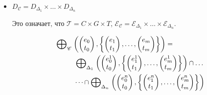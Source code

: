 \begin{itemize}

\item  $D_{\mathscr{C}} = D_{\Delta_1} \times \dots \times D_{\Delta_n}$

Это означает, что $\mathcal{T} = C \times G \times T$, $\mathcal{E}_{\mathscr{C}} = \mathcal{E}_{\Delta_1} \times \dots \times \mathcal{E}_{\Delta_n}$.

\begin{equation}
\label{composite_epp_def}
\begin{aligned}
& \mathrel{\bigoplus}_{\mathscr{C}}
\left(
\begin{pmatrix}
e_0 \\
t_0 
\end{pmatrix},
\left\{
\begin{pmatrix}
e_1 \\
t_1 
\end{pmatrix},
\dots ,
\begin{pmatrix}
e_m \\
t_m 
\end{pmatrix}
\right\}
\right) = \\
& \hspace{1cm} \mathrel{\bigoplus}_{\Delta_1}
\left(
\begin{pmatrix}
e^1_0 \\
t_0 
\end{pmatrix},
\left\{
\begin{pmatrix}
e^1_1 \\
t_1 
\end{pmatrix},
\dots ,
\begin{pmatrix}
e^1_m \\
t_m 
\end{pmatrix}
\right\}
\right) \cap \dots \\
& \hspace{1cm} \dots \cap 
\mathrel{\bigoplus}_{\Delta_n}
\left(
\begin{pmatrix}
e^n_0 \\
t_0 
\end{pmatrix},
\left\{
\begin{pmatrix}
e^n_1 \\
t_1 
\end{pmatrix},
\dots ,
\begin{pmatrix}
e^n_m \\
t_m 
\end{pmatrix}
\right\}
\right)  
\end{aligned}
\end{equation}


\end{itemize}
